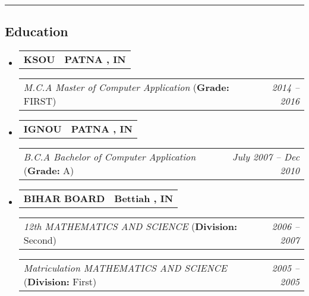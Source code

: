 \documentclass[11pt,letterpaper]{article}
\makeatletter
\newcommand{\headerrow}[2]
{\begin{tabular*}{\linewidth}{l@{\extracolsep{\fill}}r}
#1 &
#2 \\
\end{tabular*}}
\makeatother
\begin{document}
\hrule
\vspace{-1em}
\subsection*{\Large Education}

\begin{itemize}[leftmargin=1em]
	\parskip=0.1em
	
	\item
	      \headerrow
	      {\textbf{KSOU}}
	      {\textbf{PATNA , IN}}
	      \headerrow
	      {\emph{M.C.A Master of Computer Application} (\textbf{Grade:} FIRST)}
	      {\emph{2014 -- 2016}}
	      
	\item
	      \headerrow
	      {\textbf{IGNOU}}
	      {\textbf{PATNA , IN}}
	      \headerrow
	      {\emph{B.C.A Bachelor of Computer Application} (\textbf{Grade:} A)}
	      {\emph{July 2007 -- Dec 2010}}
	\item
	      \headerrow
	      {\textbf{BIHAR BOARD}}
	      {\textbf{Bettiah , IN}}
	      \headerrow
	      {\emph{12th MATHEMATICS AND SCIENCE} (\textbf{Division:} Second)}
	      {\emph{2006 -- 2007}}
	      \headerrow
	      {\emph{Matriculation MATHEMATICS AND SCIENCE} (\textbf{Division:} First)}
	      {\emph{2005 -- 2005}}
\end{itemize}
\end{document}
